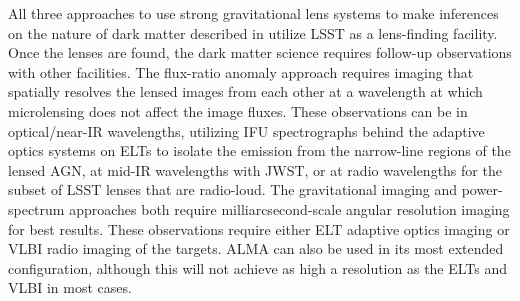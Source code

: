 All three approaches to use strong gravitational lens systems to make inferences on the nature of dark matter  described in  utilize LSST as a lens-finding facility.
Once the lenses are found, the dark matter science requires follow-up observations with other facilities.
The flux-ratio anomaly approach requires imaging that spatially resolves the lensed images from each other at a wavelength at which microlensing does not affect the image fluxes.
These observations can be in optical/near-IR wavelengths, utilizing IFU spectrographs behind the adaptive optics systems on ELTs to isolate the emission from the narrow-line regions of the lensed AGN, at mid-IR wavelengths with JWST, or at radio wavelengths for the subset of LSST lenses that are radio-loud.
The gravitational imaging and power-spectrum approaches both require milliarcsecond-scale angular resolution imaging for best results.
These observations require either ELT adaptive optics imaging or VLBI radio imaging of the targets.
ALMA can also be used in its most extended configuration, although this will not achieve as high a resolution as the ELTs and VLBI in most cases.




